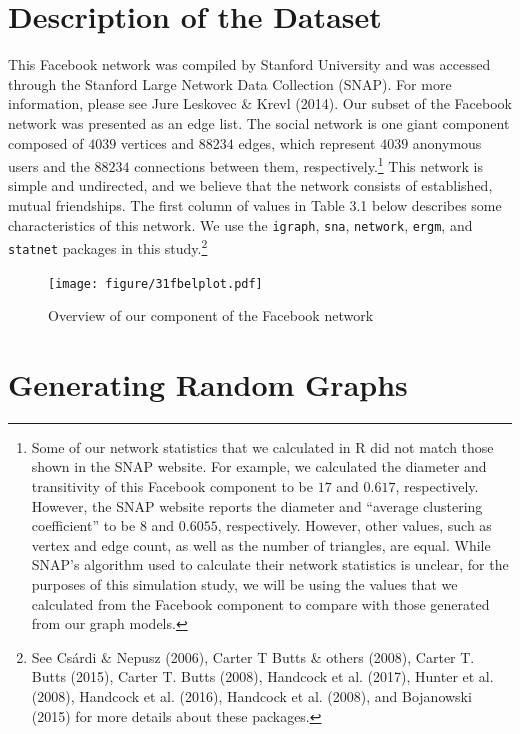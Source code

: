 \documentclass[12pt,twoside]{amherstthesis}
\begin{document}
  \section{Description of the Dataset}\label{description-of-the-dataset}
  
  This Facebook network was compiled by Stanford University and was
  accessed through the Stanford Large Network Data Collection (SNAP). For
  more information, please see Jure Leskovec \& Krevl (2014). Our subset
  of the Facebook network was presented as an edge list. The social
  network is one giant component composed of \(4039\) vertices and
  \(88234\) edges, which represent \(4039\) anonymous users and the
  \(88234\) connections between them, respectively.\footnote{Some of our
    network statistics that we calculated in R did not match those shown
    in the SNAP website. For example, we calculated the diameter and
    transitivity of this Facebook component to be \(17\) and \(0.617\),
    respectively. However, the SNAP website reports the diameter and
    ``average clustering coefficient'' to be \(8\) and \(0.6055\),
    respectively. However, other values, such as vertex and edge count, as
    well as the number of triangles, are equal. While SNAP's algorithm
    used to calculate their network statistics is unclear, for the
    purposes of this simulation study, we will be using the values that we
    calculated from the Facebook component to compare with those generated
    from our graph models.} This network is simple and undirected, and we
  believe that the network consists of established, mutual friendships.
  The first column of values in Table 3.1 below describes some
  characteristics of this network. We use the \texttt{igraph},
  \texttt{sna}, \texttt{network}, \texttt{ergm}, and \texttt{statnet}
  packages in this study.\footnote{See Csárdi \& Nepusz (2006), Carter T
    Butts \& others (2008), Carter T. Butts (2015), Carter T. Butts
    (2008), Handcock et al. (2017), Hunter et al. (2008), Handcock et al.
    (2016), Handcock et al. (2008), and Bojanowski (2015) for more details
    about these packages.}
  
  \begin{figure}[htbp]
  \centering
  \texttt{[image: figure/31fbelplot.pdf]}
  \caption{Overview of our component of the Facebook network}
  \end{figure}
  
  \section{Generating Random Graphs}\label{generating-random-graphs}
  
\end{document}
